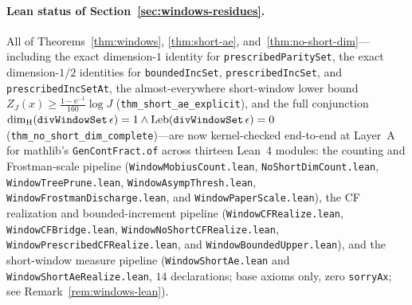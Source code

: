 \documentclass[11pt]{article}
\theoremstyle{definition}
\theoremstyle{remark}
\newcommand{\ee}{\mathrm{e}}
\newcommand{\dimH}{\dim_{\mathrm{H}}}
\begin{document}
\paragraph{Lean status of Section~\ref{sec:windows-residues}.}
All of Theorems~\ref{thm:windows}, \ref{thm:short-ae}, and~\ref{thm:no-short-dim}---including the exact dimension-$1$ identity for \texttt{prescribed\allowbreak ParitySet}, the exact dimension-$1/2$ identities for \texttt{bounded\allowbreak IncSet}, \texttt{prescribed\allowbreak IncSet}, and \texttt{prescribed\allowbreak IncSetAt}, the almost-everywhere short-window lower bound $Z_J(x)\ge\frac{1-\ee^{-1}}{160}\log J$ (\texttt{thm\_\allowbreak short\_\allowbreak ae\_\allowbreak explicit}), and the full conjunction $\dimH(\texttt{div\allowbreak WindowSet}\,\epsilon)=1\wedge\operatorname{Leb}(\texttt{div\allowbreak WindowSet}\,\epsilon)=0$ (\texttt{thm\_\allowbreak no\_\allowbreak short\_\allowbreak dim\_\allowbreak complete})---are now kernel-checked end-to-end at Layer~A for mathlib's \texttt{GenContFract.of} across thirteen Lean~4 modules: the counting and Frostman-scale pipeline (\texttt{Window\allowbreak Mobius\allowbreak Count.lean}, \texttt{No\allowbreak Short\allowbreak Dim\allowbreak Count.lean}, \texttt{Window\allowbreak Tree\allowbreak Prune.lean}, \texttt{Window\allowbreak Asymp\allowbreak Thresh.lean}, \texttt{Window\allowbreak Frostman\allowbreak Discharge.lean}, and \texttt{Window\allowbreak Paper\allowbreak Scale.lean}), the CF realization and bounded-increment pipeline (\texttt{Window\allowbreak CF\allowbreak Realize.lean}, \texttt{Window\allowbreak CF\allowbreak Bridge.lean}, \texttt{Window\allowbreak No\allowbreak Short\allowbreak CF\allowbreak Realize.lean}, \texttt{Window\allowbreak Prescribed\allowbreak CF\allowbreak Realize.lean}, and \texttt{Window\allowbreak Bounded\allowbreak Upper.lean}), and the short-window measure pipeline (\texttt{Window\allowbreak Short\allowbreak Ae.lean} and \texttt{Window\allowbreak Short\allowbreak Ae\allowbreak Realize.lean}, $14$ declarations; base axioms only, zero \texttt{sorryAx}; see Remark~\ref{rem:windows-lean}).
\end{document}
